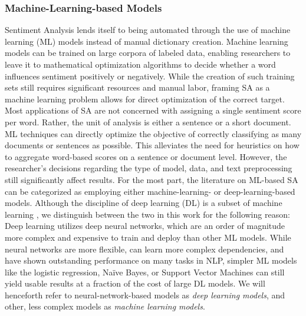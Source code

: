 \subsubsection{Machine-Learning-based Models}
\label{section-ml-based-sa}
Sentiment Analysis lends itself to being automated through the use of machine learning (ML) models instead of manual dictionary creation. Machine learning models can be trained on large corpora of labeled data, enabling researchers to leave it to mathematical optimization algorithms to decide whether a word influences sentiment positively or negatively. While the creation of such training sets still requires significant resources and manual labor, framing SA as a machine learning problem allows for direct optimization of the correct target. Most applications of SA are not concerned with assigning a single sentiment score per word. Rather, the unit of analysis is either a sentence or a short document. ML techniques can directly optimize the objective of correctly classifying as many documents or sentences as possible. This alleviates the need for heuristics on how to aggregate word-based scores on a sentence or document level. However, the researcher's decisions regarding the type of model, data, and text preprocessing still significantly affect results.\newline
For the most part, the literature on ML-based SA can be categorized as employing either machine-learning- or deep-learning-based models. Although the discipline of deep learning (DL) is a subset of machine learning , we distinguish between the two in this work for the following reason: Deep learning utilizes deep neural networks, which are an order of magnitude more complex and expensive to train and deploy than other ML models. While neural networks are more flexible, can learn more complex dependencies, and have shown outstanding performance on many tasks in NLP, simpler ML models like the logistic regression, Na\"ive Bayes, or Support Vector Machines can still yield usable results at a fraction of the cost of large DL models. We will henceforth refer to neural-network-based models as \emph{deep learning models}, and other, less complex models as \emph{machine learning models}.

